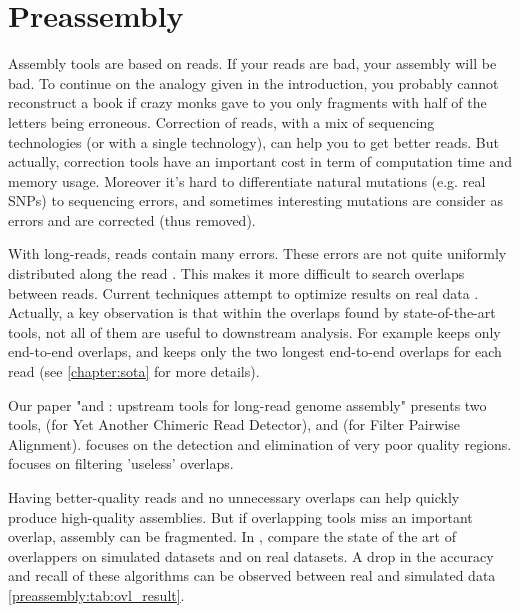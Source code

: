 \documentclass[main.tex]{subfiles}
\begin{document}
\chapter{Preassembly}\label{chapter:preassembly}

Assembly tools are based on reads. If your reads are bad, your assembly will be bad. To continue on the analogy given in the introduction, you probably cannot reconstruct a book if crazy monks gave to you only fragments with half of the letters being erroneous. Correction of reads, with a mix of sequencing technologies (or with a single technology), can help you to get better reads. But actually, correction tools have an important cost in term of computation time and memory usage. Moreover it's hard to differentiate natural mutations (e.g. real SNPs) to sequencing errors, and sometimes interesting mutations are consider as errors and are corrected (thus removed).

With long-reads, reads contain many errors. These errors are not quite uniformly distributed along the read \cite{blog_post_error_repartition}. This makes it more difficult to search overlaps between reads. Current techniques attempt to optimize results on real data \cite{ovl_bench}.
Actually, a key observation is that within the overlaps found by state-of-the-art tools, not all of them are useful to downstream analysis. For example \miniasm keeps only end-to-end overlaps, and \canu keeps only the two longest end-to-end overlaps for each read (see \ref{chapter:sota} for more details).

Our paper "\yacrd and \fpa: upstream tools for long-read genome assembly" presents two tools, \yacrd (for Yet Another Chimeric Read Detector), and \fpa (for Filter Pairwise Alignment). \yacrd focuses on the detection and elimination of very poor quality regions. \fpa focuses on filtering 'useless' overlaps.

Having better-quality reads and no unnecessary overlaps can help quickly produce high-quality assemblies. But if overlapping tools miss an important overlap, assembly can be fragmented.
In \cite{ovl_bench}, \citeauthor{ovl_bench} compare the state of the art of overlappers on simulated datasets and on real datasets. A drop in the accuracy and recall of these algorithms can be observed between real and simulated data \ref{preassembly:tab:ovl_result}.
\end{document}
